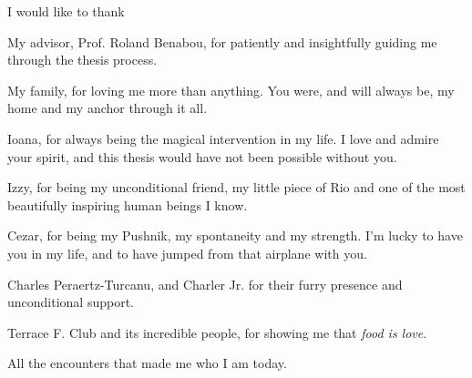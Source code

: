 I would like to thank 

My advisor, Prof. Roland Benabou, for patiently and insightfully guiding me through the thesis process. \par

My family, for loving me more than anything. You were, and will always be, my home and my anchor through it all. \par

Ioana, for always being the magical intervention in my life. I love and admire your spirit, and this thesis would have not been possible without you. \par

Izzy, for being my unconditional friend, my little piece of Rio and one of the most beautifully inspiring human beings I know. 

Cezar, for being my Pushnik, my spontaneity and my strength. I'm lucky to have you in my life, and to have jumped from that airplane with you. \par

Charles Peraertz-Turcanu, and Charler Jr. for their furry presence and unconditional support. \par

Terrace F. Club and its incredible people, for showing me that \textit{food is love}.\par

All the encounters that made me who I am today.

